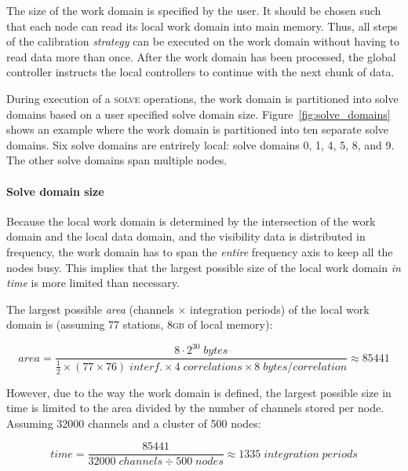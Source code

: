 \documentclass[10pt]{lofar}
\newcommand{\solve}{\textsc{solve}\xspace}
\begin{document}
The size of the work domain is specified by the user. It should be chosen such
that each node can read its local work domain into main memory. Thus, all steps
of the calibration \emph{strategy} can be executed on the work domain without
having to read data more than once. After the work domain has been processed,
the global controller instructs the local controllers to continue with the next
chunk of data.

During execution of a \solve operations, the work domain is partitioned into
solve domains based on a user specified solve domain size.
Figure~\ref{fig:solve_domains} shows an example where the work domain is
partitioned into ten separate solve domains. Six solve domains are entrirely
local: solve domains 0, 1, 4, 5, 8, and 9. The other solve domains span multiple
nodes.


\paragraph{Solve domain size}

Because the local work domain is determined by the intersection of the work
domain and the local data domain, and the visibility data is distributed in
frequency, the work domain has to span the \emph{entire} frequency axis to keep
all the nodes busy. This implies that the largest possible size of the local
work domain \emph{in time} is more limited than necessary.

The largest possible \emph{area} (channels $\times$ integration periods) of the
local work domain is (assuming 77 stations, 8\textsc{gb} of local memory):

\[
area=\frac{8\cdot2^{30}\;bytes}{\frac{1}{2}\times(77 \times 76) \; interf.
\times 4 \; correlations \times 8 \; bytes/correlation} \approx 85441
\]

However, due to the way the work domain is defined, the largest possible size in
time is limited to the area divided by the number of channels stored per node.
Assuming 32000 channels and a cluster of 500 nodes:

\[
time=\frac{85441}{32000\;channels \div 500\;nodes} \approx 1335\;integration\;
periods
\]
\end{document}
